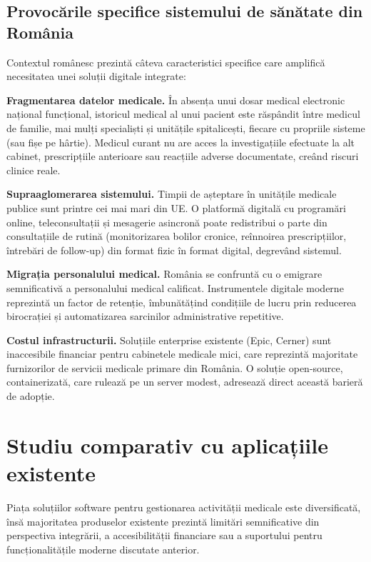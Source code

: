 \subsection{Provocările specifice sistemului de sănătate din România}

Contextul românesc prezintă câteva caracteristici specifice care amplifică necesitatea unei soluții digitale integrate:

\textbf{Fragmentarea datelor medicale.} În absența unui dosar medical electronic național funcțional, istoricul medical al unui pacient este răspândit între medicul de familie, mai mulți specialiști și unitățile spitalicești, fiecare cu propriile sisteme (sau fișe pe hârtie). Medicul curant nu are acces la investigațiile efectuate la alt cabinet, prescripțiile anterioare sau reacțiile adverse documentate, creând riscuri clinice reale.

\textbf{Supraaglomerarea sistemului.} Timpii de așteptare în unitățile medicale publice sunt printre cei mai mari din UE. O platformă digitală cu programări online, teleconsultații și mesagerie asincronă poate redistribui o parte din consultațiile de rutină (monitorizarea bolilor cronice, reînnoirea prescripțiilor, întrebări de follow-up) din format fizic în format digital, degrevând sistemul.

\textbf{Migrația personalului medical.} România se confruntă cu o emigrare semnificativă a personalului medical calificat. Instrumentele digitale moderne reprezintă un factor de retenție, îmbunătățind condițiile de lucru prin reducerea birocrației și automatizarea sarcinilor administrative repetitive.

\textbf{Costul infrastructurii.} Soluțiile enterprise existente (Epic, Cerner) sunt inaccesibile financiar pentru cabinetele medicale mici, care reprezintă majoritate furnizorilor de servicii medicale primare din România. O soluție open-source, containerizată, care rulează pe un server modest, adresează direct această barieră de adopție.

\section{Studiu comparativ cu aplicațiile existente}

Piața soluțiilor software pentru gestionarea activității medicale este diversificată, însă majoritatea produselor existente prezintă limitări semnificative din perspectiva integrării, a accesibilității financiare sau a suportului pentru funcționalitățile moderne discutate anterior.

